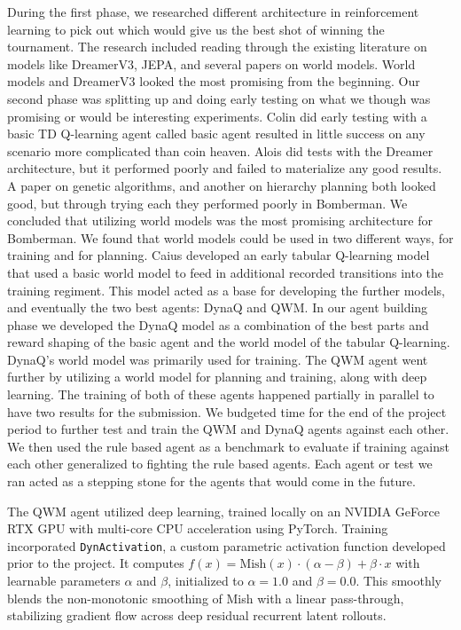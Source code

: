 \documentclass[article, 10pt]{IEEEtran}
\begin{document}
During the first phase, we researched different architecture in reinforcement learning to pick out which would give us the best shot of winning the tournament. The research included reading through the existing literature on models like DreamerV3\cite{hafner2023dreamerv3}, JEPA\cite{assran2023ijepa}, and several papers on world models\cite{dong2026qwm}\cite{ha2018worldmodels}\cite{schrittwieser2020mastering}. World models and DreamerV3 looked the most promising from the beginning. Our second phase was splitting up and doing early testing on what we though was promising or would be interesting experiments. Colin did early testing with a basic TD Q-learning agent called basic agent resulted in little success on any scenario more complicated than coin heaven. Alois did tests with the Dreamer architecture, but it performed poorly and failed to materialize any good results. A paper on genetic algorithms, and another on hierarchy planning both looked good, but through trying each they performed poorly in Bomberman. We concluded that utilizing world models was the most promising architecture for Bomberman. We found that world models could be used in two different ways, for training and for planning. Caius developed an early tabular Q-learning model that used a basic world model to feed in additional recorded transitions into the training regiment. This model acted as a base for developing the further models, and eventually the two best agents: DynaQ and QWM. In our agent building phase we developed the DynaQ model as a combination of the best parts and reward shaping of the basic agent and the world model of the tabular Q-learning. DynaQ's world model was primarily used for training. The QWM agent went further by utilizing a world model for planning and training, along with deep learning. The training of both of these agents happened partially in parallel to have two results for the submission. We budgeted time for the end of the project period to further test and train the QWM and DynaQ agents against each other. We then used the rule based agent as a benchmark to evaluate if training against each other generalized to fighting the rule based agents. Each agent or test we ran acted as a stepping stone for the agents that would come in the future.

The QWM agent utilized deep learning, trained locally on an NVIDIA GeForce RTX GPU with multi-core CPU acceleration using PyTorch. Training incorporated \texttt{DynActivation}, a custom parametric activation function developed prior to the project. It computes $f(x) = \text{Mish}(x) \cdot (\alpha - \beta) + \beta \cdot x$ with learnable parameters $\alpha$ and $\beta$, initialized to $\alpha=1.0$ and $\beta=0.0$. This smoothly blends the non-monotonic smoothing of Mish with a linear pass-through, stabilizing gradient flow across deep residual recurrent latent rollouts.
\end{document}
